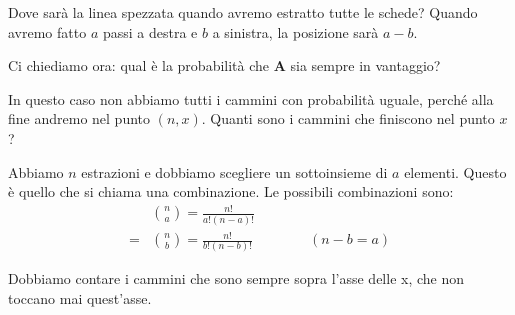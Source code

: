 \documentclass[a4paper,12pt]{book}
\begin{document}
Dove sarà la linea spezzata quando avremo estratto tutte le schede? Quando avremo fatto $ a $ passi a destra e $ b $ a sinistra, la posizione sarà $ a-b $. 

Ci chiediamo ora: qual è la probabilità che \textbf{A} sia sempre in vantaggio?

In questo caso non abbiamo tutti i cammini con probabilità uguale, perché alla fine andremo nel punto $ (n,x) $. Quanti sono i cammini che finiscono nel punto $ x $?

Abbiamo $ n $ estrazioni e dobbiamo scegliere un sottoinsieme di $ a $ elementi. Questo è quello che si chiama una combinazione. Le possibili combinazioni sono:
\begin{align*}
	& \binom{n}{a} = \frac{n!}{a!(n-a)!} \\
    = & \binom{n}{b} = \frac{n!}{b!(n-b)!} \qquad \qquad (n-b=a)
\end{align*}

Dobbiamo contare i cammini che sono sempre sopra l'asse delle x, che non toccano mai quest'asse. 
\end{document}
